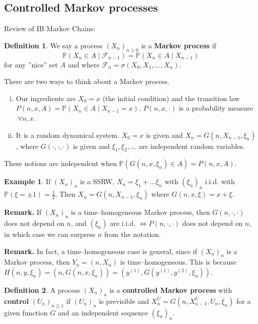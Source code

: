 \documentclass{article}
\theoremstyle{definition}
\newtheorem{example}{Example}[section]
\newtheorem{defn}{Definition}[section]
\begin{document}
\subsection{Controlled Markov processes}


Review of IB Markov Chains:
\begin{defn}
    We say a process $(X_n)_{n\ge 0}$ is a \textbf{Markov process} if $$\mathbb{P}(X_n \in A \mid \mathcal{F}_{n-1}) = \mathbb{P}(X_n \in A \mid X_{n-1})$$ for any ''nice'' set $A$ and where $\mathcal{F}_n = \sigma(X_0,X_1,\ldots,X_n)$.
\end{defn}

There are two ways to think about a Markov process.
\begin{enumerate}[(i)]
    \item Our ingredients are $X_0=x$ (the initial condition) and the transition law $P(n,x,A) = \mathbb{P}(X_n \in A \mid X_{n-1}=x)$. $P(n,x,\cdot)$ is a probability measure $~\forall n,x$.
    \item It is a random dynamical system. $X_0=x$ is given and $X_n=G(n,X_{n-1}, \xi_n)$, where $G(\cdot ,\cdot ,\cdot )$ is given and $\xi_1,\xi_2,\ldots$ are independent random variables.
\end{enumerate}
These notions are independent when $\mathbb{P}(G(n,x,\xi_n) \in A) = P(n,x,A)$.

\begin{example}
    If $(X_n)_n$ is a SSRW, $X_n=\xi_1 + \ldots \xi_n$ with $(\xi_n)_n$ i.i.d. with $\mathbb{P}(\xi = \pm 1)=\frac{1}{2}$. Then $X_n = G(n,X_{n-1},\xi_n)$ where $G(n,x,\xi) = x + \xi$.
\end{example}
\textbf{Remark.} If $(X_n)_n$ is a time--homogeneous Markov process, then $G(n,\cdot ,\cdot )$ does not depend on $n$, and $(\xi_n)$ are i.i.d. $\iff P(n,\cdot ,\cdot )$ does not depend on $n$, in which case we can surpress $n$ from the notation.

\textbf{Remark.} In fact, a time--homogeneous case is general, since if $(X_n)_n$ is a Markov process, then $Y_n=(n,X_n)$ is time--homogeneous. This is because $H(n,y,\xi_n) = (n,G(n,x,\xi_n)) = (y^{(1)}, G(y^{(1)}, y^{(2)}, \xi_n))$.

\begin{defn}
    A process $(X_n)_n$ is a \textbf{controlled Markov process} with \textbf{control} $(U_n)_{n\ge 1}$ if $(U_n)_n$ is previsible and $X^U_n = G(n,X^U_{n-1}, U_n, \xi_n)$ for a given function $G$ and an independent sequence $(\xi_n)_n$.
\end{defn}
\end{document}
